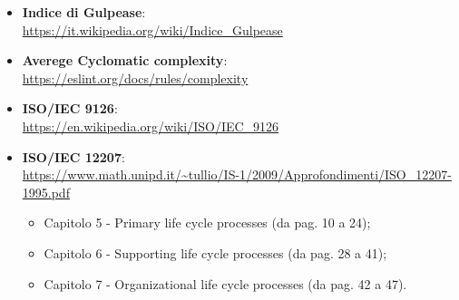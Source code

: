 \begin{itemize}
	\item \textbf{Indice di Gulpease}:\\
	\textcolor{blue}{\url{https://it.wikipedia.org/wiki/Indice_Gulpease}}
	
	\item \textbf{Averege Cyclomatic complexity}:\\
	\textcolor{blue}{\url{https://eslint.org/docs/rules/complexity}}
	
	\item \textbf{ISO/IEC 9126}:\\
	\textcolor{blue}{\url{https://en.wikipedia.org/wiki/ISO/IEC_9126}}
	
	\item \textbf{ISO/IEC 12207}:\\
	\textcolor{blue}{\url{https://www.math.unipd.it/~tullio/IS-1/2009/Approfondimenti/ISO_12207-1995.pdf}}
	\begin{itemize}
		\item Capitolo 5 - Primary life cycle processes (da pag. 10 a 24);
		\item Capitolo 6 - Supporting life cycle processes (da pag. 28 a 41);
		\item Capitolo 7 - Organizational life cycle processes (da pag. 42 a 47).
	\end{itemize}
	
\end{itemize}